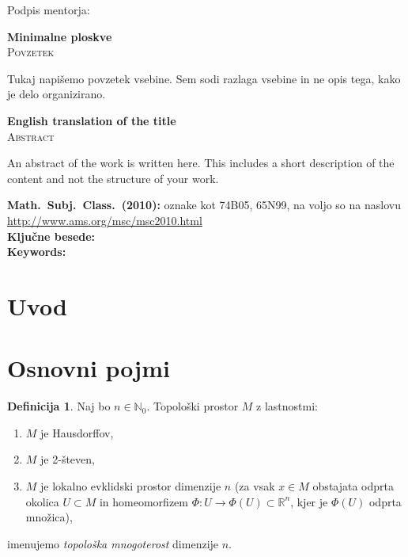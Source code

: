 \documentclass[12pt,a4paper,twoside]{article}
\newcommand{\naslovdela}{Minimalne ploskve}
\newcommand{\kljucnebesede}{} %
\newcommand{\keywords}{} %
\newcommand{\sep}{, }  %
\theoremstyle{definition} %
\newtheorem{definicija}{Definicija}[section]
\theoremstyle{plain} %
\numberwithin{equation}{section}  %
\newcommand{\R}{\mathbb R}
\newcommand{\N}{\mathbb N}
\begin{document}
\vspace{2cm}
\hspace*{\fill} Podpis mentorja: \phantom{prostor za podpis}


\cleardoublepage
{}

\begin{center}
\textbf{\naslovdela} \\[3mm]
\textsc{Povzetek} \\[2mm]
\end{center}
Tukaj napišemo povzetek vsebine. Sem sodi razlaga vsebine in ne opis tega, kako je delo
organizirano.

\vfill
\begin{center}
\textbf{English translation of the title} \\[3mm] %
\textsc{Abstract}\\[2mm]
\end{center}

An abstract of the work is written here. This includes a short description of
the content and not the structure of your work.

\vfill\noindent
\textbf{Math.~Subj.~Class.~(2010):} oznake kot 74B05, 65N99, na voljo so na naslovu
\url{http://www.ams.org/msc/msc2010.html} \\[1mm]
\textbf{Ključne besede:} \kljucnebesede \\[1mm]
\textbf{Keywords:} \keywords

\cleardoublepage

\setcounter{page}{1}    %

\section{Uvod}

\section{Osnovni pojmi}

\begin{definicija}
Naj bo $n \in \N_{0}$. Topološki prostor $M$ z lastnostmi:
\begin{enumerate}
\item $M$ je Hausdorffov,
\item $M$ je 2-števen,
\item $M$ je lokalno evklidski prostor dimenzije $n$ (za vsak $x \in M$ obstajata odprta okolica $U \subset M$ in homeomorfizem $\Phi \colon U \to \Phi(U) \subset \R^{n}$, kjer je $\Phi(U)$ odprta množica),
\end{enumerate}
imenujemo \emph{topološka mnogoterost} dimenzije $n$.
\end{definicija}
\end{document}
